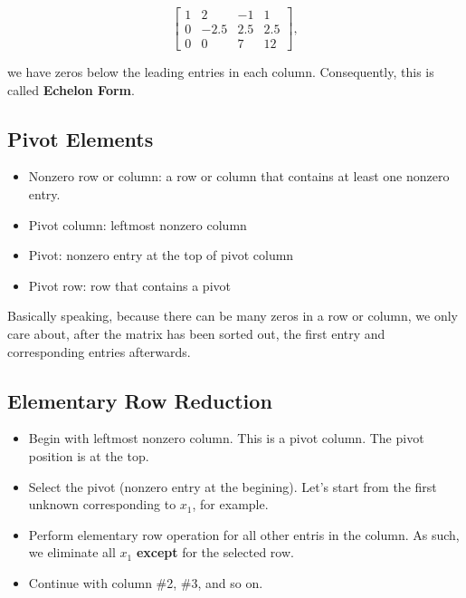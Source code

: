 \documentclass[11pt]{article}
\theoremstyle{definition}
\begin{document}
\[
\left[
\begin{array}{ccc|c}
    1 & 2 & -1 & 1 \\
    0 & -2.5 & 2.5 & 2.5 \\
    0 & 0 & 7 & 12
\end{array}
\right],
\]

we have zeros below the leading entries in each column. Consequently, this is called \textbf{Echelon Form}.

\subsection{Pivot Elements}
\begin{itemize}
    \item Nonzero row or column: a row or column that contains at least one nonzero entry.
    \item Pivot column: leftmost nonzero column
    \item Pivot: nonzero entry at the top of pivot column
    \item Pivot row: row that contains a pivot
\end{itemize}

Basically speaking, because there can be many zeros in a row or column, we only care about, after the matrix has been sorted out, the first entry and corresponding entries afterwards.


\subsection{Elementary Row Reduction}
\begin{itemize}
    \item Begin with leftmost nonzero column. This is a pivot column. The pivot position is at the top.
    \item Select the pivot (nonzero entry at the begining). Let's start from the first unknown corresponding to $x_1$, for example.
    \item Perform elementary row operation for all other entris in the column. As such, we eliminate all $x_1$ \textbf{except} for the selected row.
    \item Continue with column \#2, \#3, and so on.
\end{itemize}


\vspace{0.5em}
\noindent{}
\end{document}
